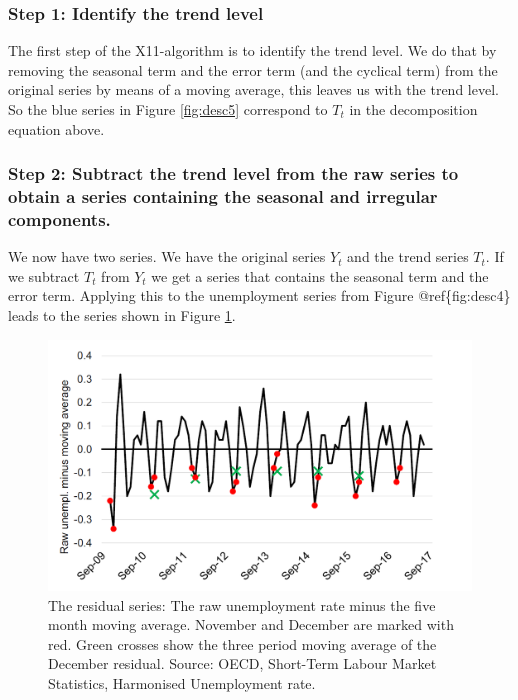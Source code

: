 \documentclass[]{book}
\begin{document}
\hypertarget{step-1-identify-the-trend-level}{%
\subsubsection*{Step 1: Identify the trend level}\label{step-1-identify-the-trend-level}}

The first step of the X11-algorithm is to identify the trend level. We do that by removing the seasonal term and the error term (and the cyclical term) from the original series by means of a moving average, this leaves us with the trend level. So the blue series in Figure \ref{fig:desc5} correspond to \(T_t\) in the decomposition equation above.

\hypertarget{step-2-subtract-the-trend-level-from-the-raw-series-to-obtain-a-series-containing-the-seasonal-and-irregular-components.}{%
\subsubsection*{Step 2: Subtract the trend level from the raw series to obtain a series containing the seasonal and irregular components.}\label{step-2-subtract-the-trend-level-from-the-raw-series-to-obtain-a-series-containing-the-seasonal-and-irregular-components.}}

We now have two series. We have the original series \(Y_t\) and the trend series \(T_t\). If we subtract \(T_t\) from \(Y_t\) we get a series that contains the seasonal term and the error term. Applying this to the unemployment series from Figure @ref\{fig:desc4\} leads to the series shown in Figure \ref{fig:desc6}.

\begin{figure}

{\centering \includegraphics[width=0.9\linewidth]{_resources/chapter_describe/ex2_4} 

}

\caption{The residual series: The raw unemployment rate minus the five month moving average. November and December are marked with red. Green crosses show the three period moving average of the December residual. Source: OECD, Short-Term Labour Market Statistics, Harmonised Unemployment rate.}\label{fig:desc6}
\end{figure}
\end{document}
